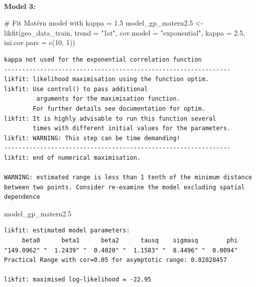 \documentclass[
  11pt,
]{article}
\makeatletter
\let\oldparagraph\paragraph
\renewcommand{\paragraph}{
    \@ifstar
      \xxxParagraphStar
      \xxxParagraphNoStar
  }
\newcommand{\xxxParagraphStar}[1]{\oldparagraph*{#1}\mbox{}}
\newcommand{\xxxParagraphNoStar}[1]{\oldparagraph{#1}\mbox{}}
\newenvironment{Shaded}{\begin{snugshade}}{\end{snugshade}}
\newcommand{\AttributeTok}[1]{\textcolor[rgb]{0.40,0.45,0.13}{#1}}
\newcommand{\CommentTok}[1]{\textcolor[rgb]{0.37,0.37,0.37}{#1}}
\newcommand{\DecValTok}[1]{\textcolor[rgb]{0.68,0.00,0.00}{#1}}
\newcommand{\FloatTok}[1]{\textcolor[rgb]{0.68,0.00,0.00}{#1}}
\newcommand{\FunctionTok}[1]{\textcolor[rgb]{0.28,0.35,0.67}{#1}}
\newcommand{\NormalTok}[1]{\textcolor[rgb]{0.00,0.23,0.31}{#1}}
\newcommand{\OtherTok}[1]{\textcolor[rgb]{0.00,0.23,0.31}{#1}}
\newcommand{\StringTok}[1]{\textcolor[rgb]{0.13,0.47,0.30}{#1}}
\makeatother
\begin{document}
\paragraph{\texorpdfstring{\textbf{Model 3:}}{Model 3:}}\label{model-3}

\begin{Shaded}
\begin{Highlighting}[]
\CommentTok{\# Fit Matérn model with kappa = 1.5}
\NormalTok{model\_gp\_matern2}\FloatTok{.5} \OtherTok{\textless{}{-}} \FunctionTok{likfit}\NormalTok{(geo\_data\_train, }\AttributeTok{trend =} \StringTok{"1st"}\NormalTok{, }
                             \AttributeTok{cov.model =} \StringTok{"exponential"}\NormalTok{, }\AttributeTok{kappa =} \FloatTok{2.5}\NormalTok{, }
                             \AttributeTok{ini.cov.pars =} \FunctionTok{c}\NormalTok{(}\DecValTok{10}\NormalTok{, }\DecValTok{1}\NormalTok{))}
\end{Highlighting}
\end{Shaded}

\begin{verbatim}
kappa not used for the exponential correlation function
---------------------------------------------------------------
likfit: likelihood maximisation using the function optim.
likfit: Use control() to pass additional
         arguments for the maximisation function.
        For further details see documentation for optim.
likfit: It is highly advisable to run this function several
        times with different initial values for the parameters.
likfit: WARNING: This step can be time demanding!
---------------------------------------------------------------
likfit: end of numerical maximisation.

WARNING: estimated range is less than 1 tenth of the minimum distance between two points. Consider re-examine the model excluding spatial dependence
\end{verbatim}

\begin{Shaded}
\begin{Highlighting}[]
\NormalTok{model\_gp\_matern2}\FloatTok{.5}
\end{Highlighting}
\end{Shaded}

\begin{verbatim}
likfit: estimated model parameters:
     beta0      beta1      beta2      tausq    sigmasq        phi 
"149.0962" "  1.2439" "  0.4020" "  1.1583" "  8.4496" "  0.0094" 
Practical Range with cor=0.05 for asymptotic range: 0.02828457

likfit: maximised log-likelihood = -22.95
\end{verbatim}
\end{document}
